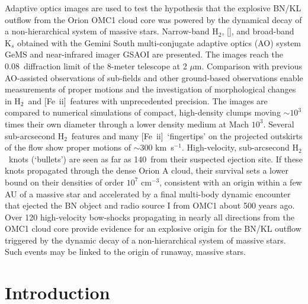 \documentclass{aa}
\newcommand{\cmq}{cm{$^{-3}$}}
\newcommand{\kms}{km~s{$^{-1}$}}
\newcommand{\Feii}{[Fe~{\sc ii}]}
\newcommand{\mum}{\ensuremath{\mu \mathrm{m}}}
\newcommand{\hh}{\ensuremath{\textrm{H}_{2}}}			%
\newcommand{\feii}{\ion{Fe}{2}}		%
\begin{document}
\abstract
{}
{Adaptive optics images are used to test the hypothesis
that the explosive  BN/KL outflow from the Orion OMC1 cloud 
core was powered by the dynamical decay of a non-hierarchical
system of massive stars.  }
{
Narrow-band \hh ,  [\feii], and broad-band K$_s$ obtained with the Gemini 
South multi-conjugate adaptive optics (AO) system GeMS and near-infrared 
imager GSAOI are presented.   
The images reach the 0.08\arcsec\ diffraction limit of the 8-meter 
telescope at 2 \mum.  Comparison with previous AO-assisted observations of 
sub-fields and other ground-based observations enable measurements of proper 
motions and the investigation of morphological changes in  \hh\ and \Feii\ features 
with  unprecedented precision.   The images are compared to numerical simulations of 
compact, high-density clumps moving $\sim 10^3$ times their own
diameter through a lower density medium at Mach $10^3$. 
}
{
Several sub-arcsecond \hh\ features and many \Feii\ `fingertips' on the 
projected outskirts of the flow show 
proper motions of $\sim$300 \kms.    High-velocity,  
sub-arcsecond   \hh\  knots (`bullets')  
are seen as far as 140\arcsec\ from their suspected ejection site.    
If these knots propagated through the dense  Orion A 
cloud, their survival  sets  a lower bound on their densities of order $10^7$ \cmq ,  
consistent with an origin within a few AU of a massive star and accelerated
by a final multi-body dynamic encounter  that ejected  
the BN  object and radio source I from OMC1 about 500 years ago.  
Over 120 high-velocity bow-shocks propagating in nearly all 
directions from the OMC1 cloud core provide evidence for an explosive 
origin for the BN/KL outflow triggered by the dynamic decay of a non-hierarchical
system of massive stars.   Such events may be linked to the origin of 
runaway, massive stars. 
}

\maketitle

\section{Introduction} 
\end{document}
